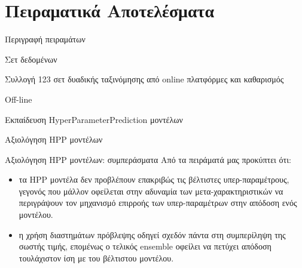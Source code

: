 \documentclass{beamer}
\begin{document}
   \section{Πειραματικά Αποτελέσματα}
  \begin{frame}{Περιγραφή πειραμάτων}
  	\begin{minipage}[t]{.3\textwidth}  		
  		Σετ δεδομένων
  		\vspace{4ex}
  	\end{minipage}%
  	\begin{minipage}[t]{.6\textwidth}
  		Συλλογή 123 σετ δυαδικής ταξινόμησης από online πλατφόρμες και καθαρισμός		  	
  		\vspace{4ex}
  	\end{minipage}
  	\begin{minipage}[t]{.3\textwidth}  		
  		Off-line
  		\vspace{4ex}
  	\end{minipage}%
  	\begin{minipage}[t]{.6\textwidth}
  		Εκπαίδευση HyperParameterPrediction μοντέλων
  		\vspace{4ex} 
  	\end{minipage} 
  \end{frame}
  \begin{frame}{Αξιολόγηση HPP μοντέλων} 
  	\begin{figure}[!htb]
  		\scalebox{0.6}{
  			}
  	\end{figure}
  \end{frame}
  \begin{frame}{Αξιολόγηση HPP μοντέλων: συμπεράσματα}
  	Από τα πειράματά μας προκύπτει ότι:
  	\begin{itemize}
  		\item τα HPP μοντέλα δεν προβλέπουν επακριβώς τις βέλτιστες υπερ-παραμέτρους, γεγονός που μάλλον οφείλεται στην αδυναμία των μετα-χαρακτηριστικών να περιγράψουν τον μηχανισμό επιρροής των υπερ-παραμέτρων στην απόδοση ενός μοντέλου.
  		\item η χρήση διαστημάτων πρόβλεψης οδηγεί σχεδόν πάντα στη συμπερίληψη της σωστής τιμής, επομένως ο τελικός ensemble οφείλει να πετύχει απόδοση τουλάχιστον ίση με του βέλτιστου μοντέλου. 
  	\end{itemize}
  \end{frame}
\end{document}
